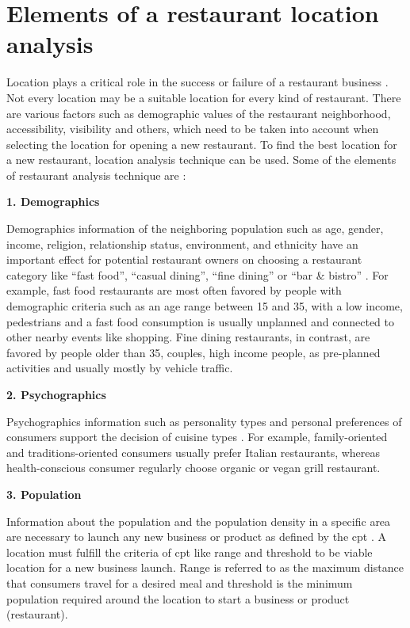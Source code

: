\documentclass[a4paper, 11pt, oneside]{Thesis}  %
\begin{document}
\section{Elements of a restaurant location analysis}
\label{elements}


Location plays a critical role in the success or failure of a restaurant business \cite{Parsa.2005} \cite{Tzeng.2002} \cite{Camillo.2008}. Not every location may be a suitable location for every kind of restaurant. There are various factors such as demographic values of the restaurant neighborhood, accessibility, visibility and others, which need to be taken into account when selecting the location for opening a new restaurant. To find the best location for a new restaurant, location analysis technique can be used. Some of the elements of restaurant analysis technique are \cite{EvanTarver.21.04.2017} \cite{Webstaurantstore.com.25.07.2018}:


 \textbf{1.	Demographics}

Demographics information of the neighboring population such as age, gender, income, religion, relationship status, environment, and ethnicity have an important effect for potential restaurant owners on choosing a restaurant category like “fast food”, “casual dining”, “fine dining” or “bar \& bistro” \cite{EvanTarver.21.04.2017}. For example, fast food restaurants are most often favored by people with demographic criteria such as an age range between 15 and 35, with a low income, pedestrians and a fast food consumption is usually unplanned and connected to other nearby events like shopping. Fine dining restaurants, in contrast, are favored by people older than 35, couples, high income people, as pre-planned activities and usually mostly by vehicle traffic.

\textbf{2.	Psychographics}

Psychographics information such as personality types and personal preferences of consumers support the decision of cuisine types \cite{EvanTarver.21.04.2017}. For example, family-oriented and traditions-oriented consumers usually prefer Italian restaurants, whereas health-conscious consumer regularly choose organic or vegan grill restaurant. 

\textbf{3.	Population}

Information about the population and the population density in a specific area are necessary to launch any new business or product as defined by the \ac{cpt} \cite{Chen.2016}. A location must fulfill the criteria of \ac{cpt} like range and threshold to be viable location for a new business launch. Range is referred to as the maximum distance that consumers travel for a desired meal and threshold is the minimum population required around the location to start a business or product (restaurant).
\end{document}
